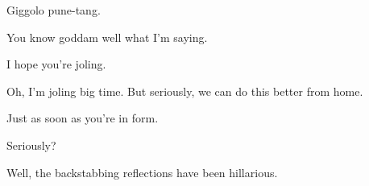 

Giggolo pune-tang.

You know goddam well what I'm saying.

I hope you're joling.

Oh, I'm joling big time.  But seriously, we can do this better from
home.

Just as soon as you're in form.

Seriously?

Well, the backstabbing reflections have been hillarious.

\bye
